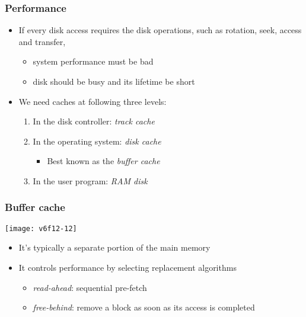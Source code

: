 \documentclass[CJKutf8,dvipsnames,table]{beamer}
\begin{document}
\begin{CJK*}{UTF8}{song}
  \begin{frame}
    \frametitle{Performance} \pause
    \begin{itemize}\parskip=0pt
    \item If every disk access requires the disk operations, such as rotation, seek, access and transfer, \pause
      \begin{itemize}\parskip=0pt
      \item system performance must be bad \pause
      \item disk should be busy and its lifetime be short \pause
      \end{itemize}
    \item We need caches at following three levels: \pause
      \begin{enumerate}\parskip=0pt
      \item In the disk controller: \emph{track cache} \pause
      \item In the operating system: \emph{disk cache} \pause
        \begin{itemize}\parskip=0pt
        \item Best known as the \emph{buffer cache} \pause
        \end{itemize}
      \item In the user program: \emph{RAM disk}
      \end{enumerate}
    \end{itemize}
  \end{frame}
  
  \begin{frame}
    \frametitle{Buffer cache} \pause
    \begin{center}
      \texttt{[image: v6f12-12]} \pause
    \end{center}
    \begin{itemize}\parskip=0pt
    \item It's typically a separate portion of the main memory \pause
    \item It controls performance by selecting replacement algorithms \pause
      \begin{itemize}\parskip=0pt
      \item \emph{read-ahead}: sequential pre-fetch \pause
      \item \emph{free-behind}: remove a block as soon as its access is completed
      \end{itemize}
    \end{itemize}
  \end{frame}
  

\end{CJK*}
\end{document}

